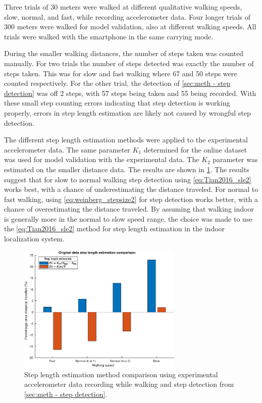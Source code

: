 Three trials of 30 meters were walked at different qualitative walking speeds, slow, normal, and fast, while recording accelerometer data. Four longer trials of 300 meters were walked for model validation, also at different walking speeds. All trials were walked with the smartphone in the same carrying mode. \par 

During the smaller walking distances, the number of steps taken was counted manually. For two trials the number of steps detected was exactly the number of steps taken. This was for slow and fast walking where 67 and 50 steps were counted respectively.  For the other trial, the detection of \cref{sec:meth - step detection} was off 2 steps, with 57 steps being taken and 55 being recorded. With these small step counting errors indicating that step detection is working properly, errors in step length estimation are likely not caused by wrongful step detection.  \par 

The different step length estimation methods were applied to the experimental accelerometer data. The same parameter $ K_1 $ determined for the online dataset was used for model validation with the experimental data. The $ K_2 $ parameter was estimated on the smaller distance data. The results are shown in \cref{fig:step_length_personal_testing}. The results suggest that for slow to normal walking step detection using \eqref{eq:Tian2016_sle2} works best, with a chance of underestimating the distance traveled. For normal to fast walking, using \eqref{eq:weinberg_stepsize2} for step detection works better, with a chance of overestimating the distance traveled. By assuming that walking indoor is generally more in the normal to slow speed range, the choice was made to use the \eqref{eq:Tian2016_sle2} method for step length estimation in the indoor localization system.
\begin{figure}[H]
	\centering
	\includegraphics[width=0.7\textwidth]{images/20201128_1430_original_data_step_length_estimation_comparison}
		\setlength{\belowcaptionskip}{-15pt}
	\caption{Step length estimation method comparison using experimental accelerometer data recording while walking and step detection from \cref{sec:meth - step detection}. }
	\label{fig:step_length_personal_testing}
\end{figure}

